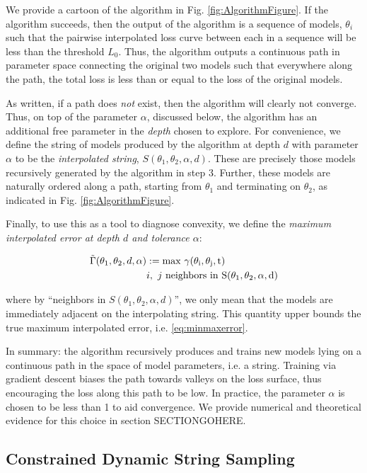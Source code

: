 \documentclass[twocolumn,superscriptaddress,aps,prb,floatfix]{revtex4-1}
\newcommand{\figref}[1]{Fig. \ref{#1}}
\begin{document}
 We provide a cartoon of the algorithm in \figref{fig:AlgorithmFigure}.  If the algorithm succeeds, then the output of the algorithm is a sequence of models, $\theta_i$ such that the pairwise interpolated loss curve between each in a sequence will be less than the threshold $L_0$.  Thus, the algorithm outputs a continuous path in parameter space connecting the original two models such that everywhere along the path, the total loss is less than or equal to the loss of the original models.
 
 As written, if a path does \emph{not} exist, then the algorithm will clearly not converge.  Thus, on top of the parameter $\alpha$, discussed below, the algorithm has an additional free parameter in the \emph{depth} chosen to explore.  For convenience, we define the string of models produced by the algorithm at depth $d$ with parameter $\alpha$ to be the \emph{interpolated string}, $S(\theta_1, \theta_2, \alpha, d)$.  These are precisely those models recursively generated by the algorithm in step 3.  Further, these models are naturally ordered along a path, starting from $\theta_1$ and terminating on $\theta_2$, as indicated in \figref{fig:AlgorithmFigure}.
 
 Finally, to use this as a tool to diagnose convexity, we define the \emph{maximum interpolated error at depth $d$ and tolerance $\alpha$}:
 
 \begin{align}
 \tilde{\Gamma}( \theta_1, \theta_2, d, \alpha ) &:= \rm{max}\ \gamma(\theta_i, \theta_j, t)\\ \notag
 &i,\ j\ \rm{neighbors\ in}\ S(\theta_1, \theta_2, \alpha, d)
 \end{align}
 
 where by ``neighbors in $S(\theta_1, \theta_2, \alpha, d)$'', we only mean that the models are immediately adjacent on the interpolating string.  This quantity upper bounds the true maximum interpolated error, i.e. \eqref{eq:minmaxerror}.
 
 In summary: the algorithm recursively produces and trains new models lying on a continuous path in the space of model parameters, i.e. a string.  Training via gradient descent biases the path towards valleys on the loss surface, thus encouraging the loss along this path to be low.  In practice, the parameter $\alpha$ is chosen to be less than 1 to aid convergence.  We provide numerical and theoretical evidence for this choice in section SECTIONGOHERE.
 

  \subsection{Constrained Dynamic String Sampling}
  \label{sec:ConstrainedAlg}
  
\end{document}
